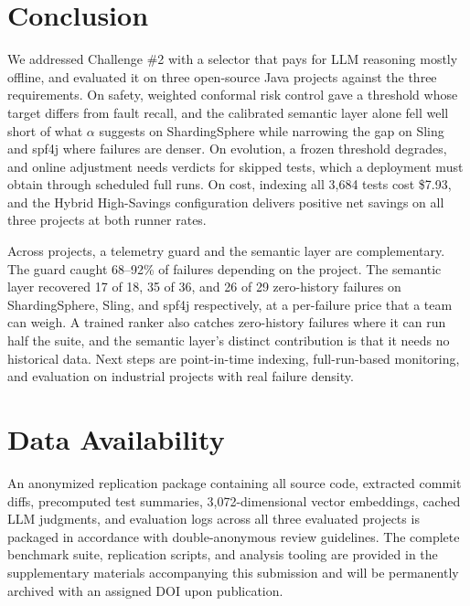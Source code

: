 \section{Conclusion}
\label{sec:conclusion}

We addressed Challenge \#2 with a selector that pays for LLM reasoning mostly offline, and evaluated it on three open-source Java projects against the three requirements. On safety, weighted conformal risk control gave a threshold whose target differs from fault recall, and the calibrated semantic layer alone fell well short of what $\alpha$ suggests on ShardingSphere while narrowing the gap on Sling and spf4j where failures are denser. On evolution, a frozen threshold degrades, and online adjustment needs verdicts for skipped tests, which a deployment must obtain through scheduled full runs. On cost, indexing all 3,684 tests cost \$7.93, and the Hybrid High-Savings configuration delivers positive net savings on all three projects at both runner rates.

Across projects, a telemetry guard and the semantic layer are complementary. The guard caught 68--92\% of failures depending on the project. The semantic layer recovered 17 of 18, 35 of 36, and 26 of 29 zero-history failures on ShardingSphere, Sling, and spf4j respectively, at a per-failure price that a team can weigh. A trained ranker also catches zero-history failures where it can run half the suite, and the semantic layer's distinct contribution is that it needs no historical data. Next steps are point-in-time indexing, full-run-based monitoring, and evaluation on industrial projects with real failure density.

\section*{Data Availability}

An anonymized replication package containing all source code, extracted commit diffs, precomputed test summaries, 3,072-dimensional vector embeddings, cached LLM judgments, and evaluation logs across all three evaluated projects is packaged in accordance with double-anonymous review guidelines. The complete benchmark suite, replication scripts, and analysis tooling are provided in the supplementary materials accompanying this submission and will be permanently archived with an assigned DOI upon publication.
